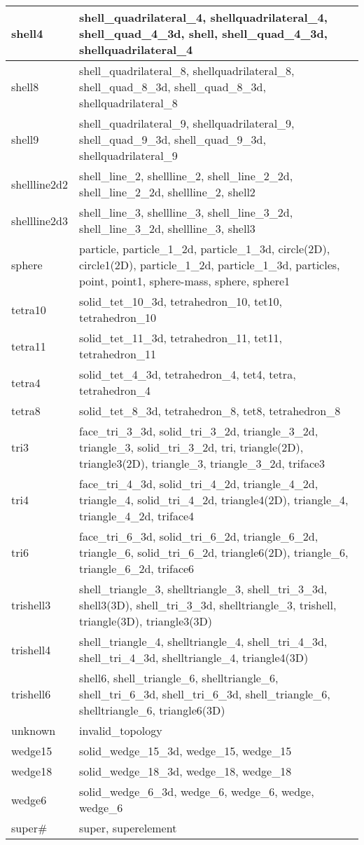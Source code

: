 \documentclass[11pt,twoside]{article}
\begin{document}
\begin{longtable}{l|>{\raggedright\arraybackslash}p{4.0in}}
shell4    & shell\_quadrilateral\_4, shellquadrilateral\_4, shell\_quad\_4\_3d, shell, shell\_quad\_4\_3d, shellquadrilateral\_4 \\ \hline
shell8    & shell\_quadrilateral\_8, shellquadrilateral\_8, shell\_quad\_8\_3d, shell\_quad\_8\_3d, shellquadrilateral\_8 \\ \hline
shell9    & shell\_quadrilateral\_9, shellquadrilateral\_9, shell\_quad\_9\_3d, shell\_quad\_9\_3d, shellquadrilateral\_9 \\ \hline
shellline2d2 & shell\_line\_2, shellline\_2, shell\_line\_2\_2d, shell\_line\_2\_2d, shellline\_2, shell2 \\ \hline
shellline2d3 & shell\_line\_3, shellline\_3, shell\_line\_3\_2d, shell\_line\_3\_2d, shellline\_3, shell3 \\ \hline
sphere    & particle, particle\_1\_2d, particle\_1\_3d, circle(2D), circle1(2D), particle\_1\_2d, particle\_1\_3d, particles, point, point1, sphere-mass, sphere, sphere1 \\ \hline
tetra10   & solid\_tet\_10\_3d, tetrahedron\_10, tet10, tetrahedron\_10 \\ \hline
tetra11   & solid\_tet\_11\_3d, tetrahedron\_11, tet11, tetrahedron\_11 \\ \hline
tetra4    & solid\_tet\_4\_3d, tetrahedron\_4, tet4, tetra, tetrahedron\_4 \\ \hline
tetra8    & solid\_tet\_8\_3d, tetrahedron\_8, tet8, tetrahedron\_8 \\ \hline
tri3      & face\_tri\_3\_3d, solid\_tri\_3\_2d, triangle\_3\_2d, triangle\_3, solid\_tri\_3\_2d, tri, triangle(2D), triangle3(2D), triangle\_3, triangle\_3\_2d, triface3 \\ \hline
tri4      & face\_tri\_4\_3d, solid\_tri\_4\_2d, triangle\_4\_2d, triangle\_4, solid\_tri\_4\_2d, triangle4(2D), triangle\_4, triangle\_4\_2d, triface4 \\ \hline
tri6      & face\_tri\_6\_3d, solid\_tri\_6\_2d, triangle\_6\_2d, triangle\_6, solid\_tri\_6\_2d, triangle6(2D), triangle\_6, triangle\_6\_2d, triface6 \\ \hline
trishell3 & shell\_triangle\_3, shelltriangle\_3, shell\_tri\_3\_3d, shell3(3D), shell\_tri\_3\_3d, shelltriangle\_3, trishell, triangle(3D), triangle3(3D) \\ \hline
trishell4 & shell\_triangle\_4, shelltriangle\_4, shell\_tri\_4\_3d, shell\_tri\_4\_3d, shelltriangle\_4, triangle4(3D) \\ \hline
trishell6 & shell6, shell\_triangle\_6, shelltriangle\_6, shell\_tri\_6\_3d, shell\_tri\_6\_3d, shell\_triangle\_6, shelltriangle\_6, triangle6(3D) \\ \hline
unknown   & invalid\_topology \\ \hline
wedge15   & solid\_wedge\_15\_3d, wedge\_15, wedge\_15 \\ \hline
wedge18   & solid\_wedge\_18\_3d, wedge\_18, wedge\_18 \\ \hline
wedge6    & solid\_wedge\_6\_3d, wedge\_6, wedge\_6, wedge, wedge\_6 \\ \hline
super\#    & super, superelement \\
\hline
\end{longtable}
\end{document}
